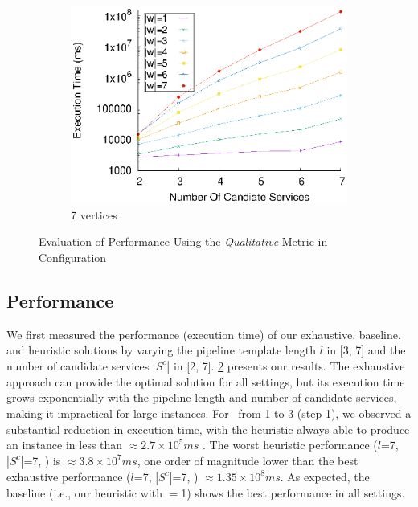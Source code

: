 \begin{figure}[!ht]
\begin{subfigure}{0.45\textwidth}
        \includegraphics[width=\textwidth]{Images/graphs/window_time_performance_qualitative_n7_s7_50_80_n7}
        \caption{7 vertices}
        \label{fig:time_window_perce_wide_7n}
      \end{subfigure}
      \caption{{\color{OurColor2}Evaluation of Performance Using the \emph{Qualitative} Metric in
            Configuration \average}}
      \label{fig:time_window_perce_average}
    \end{figure}
    \subsection{Performance}\label{subsec:experiments_performance}
    We first measured the performance (execution time) of our exhaustive, baseline, and heuristic solutions by varying the pipeline template length $l$ in [3, 7] and the number of candidate services $|S^c|$ in [2, 7]. \cref{fig:time_window_perce_average} presents our results.
    The exhaustive approach can provide the optimal solution for all settings, but its execution time grows exponentially with the pipeline length and number of candidate services, making it impractical for large instances. For \windowsize\ from 1 to 3 (step 1), we observed a substantial reduction in execution time, with the heuristic always able to produce an instance in less than $\approx2.7\times10^5ms$ . The worst heuristic performance ($l$=7, $|S^c|$=7, ) is $\approx3.8\times10^7ms$, one order of magnitude lower than the best exhaustive performance ($l$=7, $|S^c|$=7, ) $\approx1.35\times10^8ms$. {\color{OurColor} As expected, the baseline (i.e., our heuristic with \windowsize$=$1) shows the best performance in all settings.}


